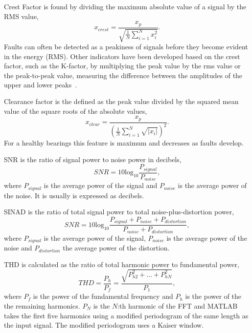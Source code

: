 \documentclass[]{article}
\begin{document}
Crest Factor is found by dividing the maximum absolute value of a signal by the \gls{RMS} value,
\begin{equation}
x_{crest} = \frac{x_p}{\sqrt{\frac{1}{N}\sum^N_{i=1}x^2_i}}.
\end{equation}
Faults can often be detected as a peakiness of signals before they become evident in the energy (\gls{RMS}). Other indicators have been developed based on the crest factor, such as the K-factor, by multiplying the peak value by the rms value or the peak-to-peak value, measuring the difference between the amplitudes of the upper and lower peaks~\cite{soualhi2021novel}.

Clearance factor is the defined as the peak value divided by the squared mean value of the square roots of the absolute values,
\begin{equation}
x_{clear} = \frac{x_p}{(\frac{1}{N}\sum^N_{i=1}\sqrt{|x_i|})^2}.
\end{equation}
For a healthy bearings this feature is maximum and decreases as faults develop.

\gls{SNR} is the ratio of signal power to noise power in decibels,
\begin{equation}
	SNR = 10 \textrm{log}_{10} \frac{P_{signal}}{P_{noise}},
\end{equation}
where $P_{signal}$ is the average power of the signal and $P_{noise}$ is the average power of the noise. It is usually is expressed as decibels.


\gls{SINAD} is the ratio of total signal power to total noise-plus-distortion power,
\begin{equation}
	SNR = 10 \textrm{log}_{10} \frac{P_{signal} + P_{noise} + P_{distortion}}{P_{noise} + P_{distortion}}, 
\end{equation}
where $P_{signal}$ is the average power of the signal, $P_{noise}$ is the average power of the noise and $P_{distortion}$ the average power of the distortion.

\gls{THD} is calculated as the ratio of total harmonic power to fundamental power,
\begin{equation}
	THD = \frac{P_{h}}{P_{f}} = \frac{\sqrt{P^2_{h2} + \hdots + P^2_{hN}}}{P_1},
\end{equation}
where $P_{f}$ is the power of the fundamental frequency and $P_{h}$ is the power of the the remaining harmonics. $P_N$ is the $N$:th harmonic of the \gls{FFT} and MATLAB takes the first five harmonics using a modified periodogram of the same length as the input signal. The modified periodogram uses a Kaiser window.
\end{document}
